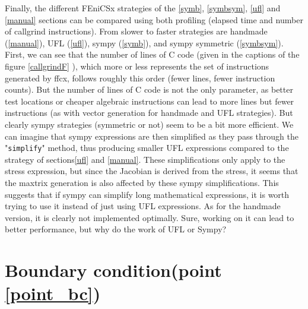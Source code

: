 \documentclass[12pt]{article}
\newcommand{\f}[1]{FEniCSx#1}
\newcommand{\mycodepy}[1]{\textsf{"}\lstinline[language=Python]`#1`\textsf{"}}
\begin{document}
\bigskip
Finally, the different \f{} strategies of the \ref{symb}, \ref{symbsym}, \ref{ufl} and \ref{manual} sections can be compared using both profiling (elapsed time and number of callgrind instructions). 	
From slower to faster strategies are handmade (\ref{manual}), UFL (\ref{ufl}), sympy (\ref{symb}), and sympy symmetric (\ref{symbsym}).
First, we can see that the number of lines of C code (given in the captions of the figure \ref{callgrindF} ), which more or less represents the set of instructions generated by ffcx, follows roughly this order (fewer lines, fewer instruction counts).
But the number of lines of C code is not the only parameter, as better test locations or cheaper algebraic instructions can lead to more lines but fewer instructions (as with vector generation for handmade and UFL strategies).
But clearly sympy strategies (symmetric or not) seem to be a bit more efficient. We can imagine that sympy expressions are then simplified as they pass through the \mycodepy{simplify} method, thus producing smaller UFL expressions compared to the strategy of sections\ref{ufl} and \ref{manual}. These simplifications only apply to the stress expression, but since the Jacobian is derived from the stress, it seems that the maxtrix generation is also affected by these sympy simplifications. This suggests that if sympy can simplify long mathematical expressions, it is worth trying to use it instead of just using UFL expressions.
As for the handmade version, it is clearly not implemented optimally.
Sure, working on it can lead to better performance, but why do the work of UFL or Sympy? 



 

\section{Boundary condition(point \ref{point_bc})}
\end{document}
